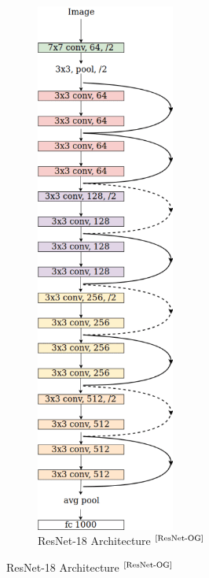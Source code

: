 \documentclass[
11pt, %
english, %
singlespacing, %
headsepline, %
]{project_structure}
\begin{document}
\begin{figure}[H]
     \centering
     \begin{subfigure}[b]{0.4\textwidth}
         \centering
         \includegraphics[width=0.5\textwidth]{figures/background/ResNet18.png}
         \caption{\acrshort{ResNet}-18 Architecture $^{\text{\cite{ResNet-OG}}}$}

\end{subfigure}
\end{figure}
\end{document}
